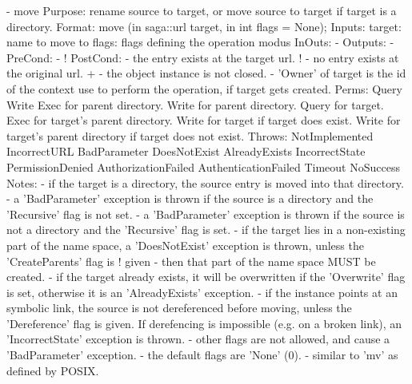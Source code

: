 \begin{myspec}
 
    - move
      Purpose:  rename source to target, or move source to
                target if target is a directory.
      Format:   move               (in  saga::url target,
                                    in  int       flags = None);
      Inputs:   target:             name to move to
                flags:              flags defining the operation
                                    modus
      InOuts:   -
      Outputs:  -
      PreCond:  -
!     PostCond: - the entry exists at the target url.
!               - no entry exists at the original url.
+               - the object instance is not closed.
                - 'Owner' of target is the id of the context
                  use to perform the operation, if target gets
                  created.
      Perms:    Query 
                Write 
                Exec  for parent directory.
                Write for parent directory.
                Query for target.
                Exec  for target's parent directory.
                Write for target
                      if  target does exist.
                Write for target's parent directory 
                      if  target does not exist.
      Throws:   NotImplemented
                IncorrectURL
                BadParameter
                DoesNotExist
                AlreadyExists
                IncorrectState
                PermissionDenied
                AuthorizationFailed
                AuthenticationFailed
                Timeout
                NoSuccess
      Notes:    - if the target is a directory, the source entry
                  is moved into that directory.
                - a 'BadParameter' exception is thrown if the 
                  source is a directory and the 'Recursive' flag 
                  is not set.
                - a 'BadParameter' exception is thrown if the 
                  source is not a directory and the 'Recursive' 
                  flag is set.
                - if the target lies in a non-existing part of
                  the name space, a 'DoesNotExist' exception is
                  thrown, unless the 'CreateParents' flag is
!                 given - then that part of the name space MUST
                  be created.
                - if the target already exists, it will be
                  overwritten if the 'Overwrite' flag is set,
                  otherwise it is an 'AlreadyExists' exception.
                - if the instance points at an symbolic link, 
                  the source is not dereferenced before moving,
                  unless the 'Dereference' flag is given.
                  If derefencing is impossible (e.g. on a broken 
                  link), an 'IncorrectState' exception is thrown.
                - other flags are not allowed, and cause a
                  'BadParameter' exception.
                - the default flags are 'None' (0).
                - similar to 'mv' as defined by POSIX.
 

\end{myspec}
